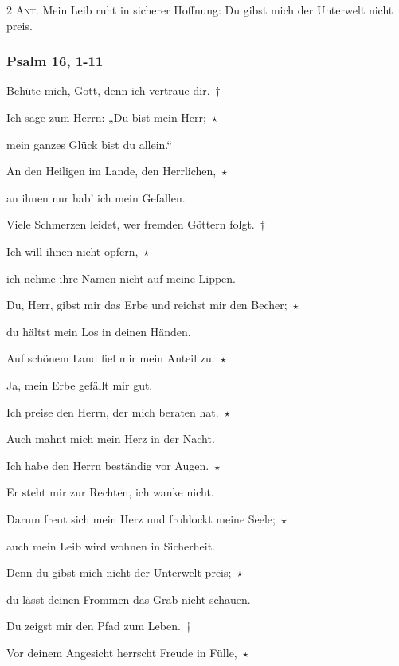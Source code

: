 \vspace{10pt}

\noindent \textsc{2 Ant.} Mein Leib ruht in sicherer Hoffnung: Du gibst mich der Unterwelt nicht preis.

\subsubsection{Psalm 16, 1-11}

\noindent Behüte mich, Gott, denn ich vertraue dir.~†~\nopagebreak

Ich sage zum Herrn: „Du bist mein Herr;~$\star$~\nopagebreak

mein ganzes Glück bist du allein.“

\noindent An den Heiligen im Lande, den Herrlichen,~$\star$~\nopagebreak

an ihnen nur hab’ ich mein Gefallen.

\noindent Viele Schmerzen leidet, wer fremden Göttern folgt.~†~\nopagebreak

Ich will ihnen nicht opfern,~$\star$~\nopagebreak

ich nehme ihre Namen nicht auf meine Lippen.

\noindent Du, Herr, gibst mir das Erbe und reichst mir den Becher;~$\star$~\nopagebreak

du hältst mein Los in deinen Händen.

\noindent Auf schönem Land fiel mir mein Anteil zu.~$\star$~\nopagebreak

Ja, mein Erbe gefällt mir gut.

\noindent Ich preise den Herrn, der mich beraten hat.~$\star$~\nopagebreak

Auch mahnt mich mein Herz in der Nacht.

\noindent Ich habe den Herrn beständig vor Augen.~$\star$~\nopagebreak

Er steht mir zur Rechten, ich wanke nicht.

\noindent Darum freut sich mein Herz und frohlockt meine Seele;~$\star$~\nopagebreak

auch mein Leib wird wohnen in Sicherheit.

\noindent Denn du gibst mich nicht der Unterwelt preis;~$\star$~\nopagebreak

du lässt deinen Frommen das Grab nicht schauen.

\noindent Du zeigst mir den Pfad zum Leben.~†~\nopagebreak

Vor deinem Angesicht herrscht Freude in Fülle,~$\star$~\nopagebreak


